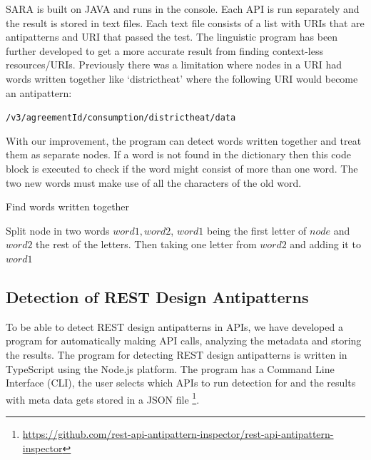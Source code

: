 SARA is built on JAVA and runs in the console. Each API is run separately and the result is stored in text files. Each text file consists of a list with URIs that are antipatterns and URI that passed the test.
The linguistic program has been further developed to get a more accurate result from finding context-less resources/URIs. Previously there was a limitation where nodes in a URI had words written together like `districtheat' where the following URI would become an antipattern: 

\vspace{2mm}
\texttt{/v3/{agreementId}/consumption/districtheat/data}

\vspace{2mm}
With our improvement, the program can detect words written together and treat them as separate nodes. If a word is not found in the dictionary then this code block is executed to check if the word might consist of more than one word. The two new words must make use of all the characters of the old word.

\begin{algorithm}
\caption{Find words written together}
\begin{algorithmic}
    \STATE Split node in two words $word1, word2$, $word1$ being the first letter of $node$ and $word2$ the rest of the letters.
        \STATE Then taking one letter from $word2$ and adding it to $word1$
    \ENDWHILE  
\ENDIF
\end{algorithmic}
\end{algorithm}

\subsection{Detection of REST Design Antipatterns}

To be able to detect REST design antipatterns in APIs, we have developed a program for automatically making API calls, analyzing the metadata and storing the results. 
The program for detecting REST design antipatterns is written in TypeScript using the Node.js platform. The program has a Command Line Interface (CLI), the user selects which APIs to run detection for and the results with meta data gets stored in a JSON file \footnote{\url{https://github.com/rest-api-antipattern-inspector/rest-api-antipattern-inspector}}. 

